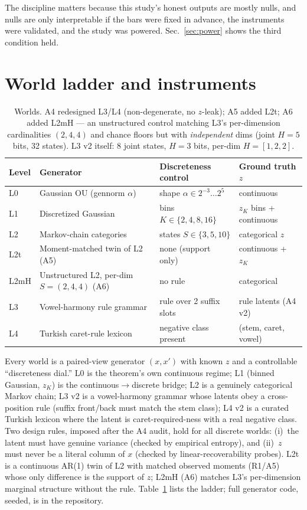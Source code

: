 \documentclass[11pt]{article}
\begin{document}
The discipline matters because this study's honest outputs are mostly nulls,
and nulls are only interpretable if the bars were fixed in advance, the
instruments were validated, and the study was powered. Sec.~\ref{sec:power}
shows the third condition held.

\section{World ladder and instruments}
\label{sec:worlds}
\begin{table}[ht]\centering\small
\begin{tabular}{@{}llll@{}}
\toprule
Level & Generator & Discreteness control & Ground truth $z$ \\
\midrule
L0 & Gaussian OU (gennorm $\alpha$) & shape $\alpha \in 2^{-3}\dots 2^5$ &
continuous \\
L1 & Discretized Gaussian & bins $K \in \{2,4,8,16\}$ & $z_K$ bins + continuous \\
L2 & Markov-chain categories & states $S \in \{3,5,10\}$ & categorical $z$ \\
L2t & Moment-matched twin of L2 (A5) & none (support only) & continuous + $z_K$ \\
L2mH & Unstructured L2, per-dim $S{=}(2,4,4)$ (A6) & no rule & categorical \\
L3 & Vowel-harmony rule grammar & rule over 2 suffix slots & rule latents (A4 v2) \\
L4 & Turkish caret-rule lexicon & negative class present & (stem, caret, vowel) \\
\bottomrule
\end{tabular}
\caption{Worlds. A4 redesigned L3/L4 (non-degenerate, no $z$-leak); A5 added
L2t; A6 added L2mH --- an unstructured control matching L3's per-dimension
cardinalities $(2,4,4)$ and chance floors but with \emph{independent} dims
(joint $H{=}5$ bits, 32 states). L3 v2 itself: 8 joint states, $H{=}3$ bits,
per-dim $H{=}[1,2,2]$.}
\label{tab:worlds}
\end{table}

Every world is a paired-view generator $(x,x')$ with known $z$ and a
controllable ``discreteness dial.'' L0 is the theorem's own continuous regime;
L1 (binned Gaussian, $z_K$) is the continuous$\to$discrete bridge; L2 is a
genuinely categorical Markov chain; L3 v2 is a vowel-harmony grammar whose
latents obey a cross-position rule (suffix front/back must match the stem
class); L4 v2 is a curated Turkish lexicon where the latent is
caret-required-ness with a real negative class. Two design rules, imposed after
the A4 audit, hold for all discrete worlds: (i)~the latent must have genuine
variance (checked by empirical entropy), and (ii)~$z$ must never be a literal
column of $x$ (checked by linear-recoverability probes). L2t is a continuous
AR(1) twin of L2 with matched observed moments (R1/A5) whose only difference is
the support of $z$; L2mH (A6) matches L3's per-dimension marginal structure
without the rule. Table~\ref{tab:worlds} lists the ladder; full generator
code, seeded, is in the repository.
\end{document}
